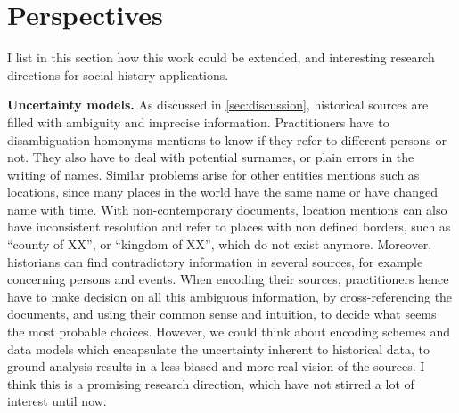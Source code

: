 \section{Perspectives}\label{sec:perspectives}

I list in this section how this work could be extended, and interesting research directions for social history \va applications.


\noindent\textbf{Uncertainty models.} As discussed in \autoref{sec:discussion}, historical sources are filled with ambiguity and imprecise information.
Practitioners have to disambiguation homonyms mentions to know if they refer to different persons or not. They also have to deal with potential surnames, or plain errors in the writing of names.
Similar problems arise for other entities mentions such as locations, since many places in the world have the same name or have changed name with time.
With non-contemporary documents, location mentions can also have inconsistent resolution and refer to places with non defined borders, such as ``county of XX'', or ``kingdom of XX'', which do not exist anymore.
Moreover, historians can find contradictory information in several sources, for example concerning persons and events.
When encoding their sources, practitioners hence have to make decision on all this ambiguous information, by cross-referencing the documents, and using their common sense and intuition, to decide what seems the most probable choices.
However, we could think about encoding schemes and data models which encapsulate the uncertainty inherent to historical data, to ground analysis results in a less biased and more real vision of the sources.
I think this is a promising research direction, which have not stirred a lot of interest until now.


